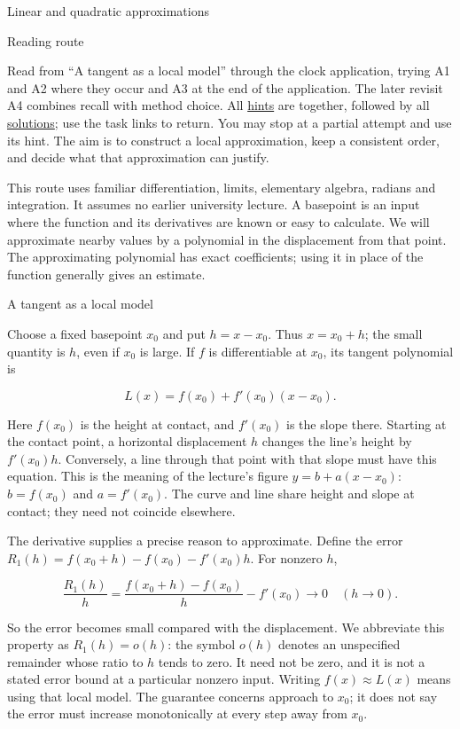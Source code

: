 \documentclass[
  11pt,
]{article}
\author{}
\date{}
\begin{document}
Linear and quadratic approximations

Reading route

Read from ``A tangent as a local model'' through the clock application,
trying A1 and A2 where they occur and A3 at the end of the application.
The later revisit A4 combines recall with method choice. All
\protect\hyperlink{hints}{hints} are together, followed by all
\protect\hyperlink{solutions}{solutions}; use the task links to return.
You may stop at a partial attempt and use its hint. The aim is to
construct a local approximation, keep a consistent order, and decide
what that approximation can justify.

This route uses familiar differentiation, limits, elementary algebra,
radians and integration. It assumes no earlier university lecture. A
basepoint is an input where the function and its derivatives are known
or easy to calculate. We will approximate nearby values by a polynomial
in the displacement from that point. The approximating polynomial has
exact coefficients; using it in place of the function generally gives an
estimate.

A tangent as a local model

Choose a fixed basepoint \(x_0\) and put \(h=x-x_0\). Thus \(x=x_0+h\);
the small quantity is \(h\), even if \(x_0\) is large. If \(f\) is
differentiable at \(x_0\), its tangent polynomial is

\[L(x)=f(x_0)+f'(x_0)(x-x_0).\]

Here \(f(x_0)\) is the height at contact, and \(f'(x_0)\) is the slope
there. Starting at the contact point, a horizontal displacement \(h\)
changes the line's height by \(f'(x_0)h\). Conversely, a line through
that point with that slope must have this equation. This is the meaning
of the lecture's figure \(y=b+a(x-x_0)\): \(b=f(x_0)\) and
\(a=f'(x_0)\). The curve and line share height and slope at contact;
they need not coincide elsewhere.

The derivative supplies a precise reason to approximate. Define the
error \(R_1(h)=f(x_0+h)-f(x_0)-f'(x_0)h\). For nonzero \(h\),

\[\frac{R_1(h)}h=\frac{f(x_0+h)-f(x_0)}h-f'(x_0)\longrightarrow0\quad(h\to0).\]

So the error becomes small compared with the displacement. We abbreviate
this property as \(R_1(h)=o(h)\): the symbol \(o(h)\) denotes an
unspecified remainder whose ratio to \(h\) tends to zero. It need not be
zero, and it is not a stated error bound at a particular nonzero input.
Writing \(f(x)\approx L(x)\) means using that local model. The guarantee
concerns approach to \(x_0\); it does not say the error must increase
monotonically at every step away from \(x_0\).
\end{document}
